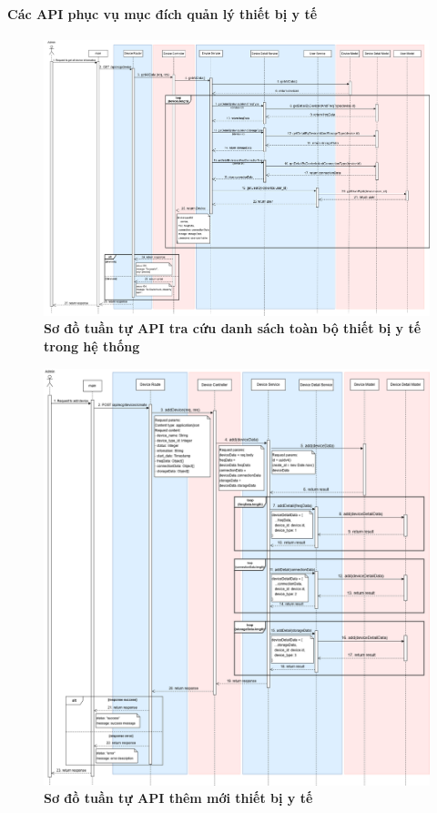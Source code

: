 \paragraph{Các API phục vụ mục đích quản lý thiết bị y tế}
\mbox{}
\begin{figure}[H]
	\centering
	\includegraphics[width=16cm]{Images/api_sequence/device/device-GetAllDevice.drawio.png}
	\caption[Sơ đồ tuần tự API tra cứu danh sách toàn bộ thiết bị y tế trong hệ thống]{\bfseries \fontsize{12pt}{0pt}\selectfont Sơ đồ tuần tự API tra cứu danh sách toàn bộ thiết bị y tế trong hệ thống}
	\label{sequence_diagram_get_all_devices}
\end{figure}

\begin{figure}[H]
	\centering
	\includegraphics[width=16cm]{Images/api_sequence/device/device-Add.drawio.png}
	\caption[Sơ đồ tuần tự API thêm mới thiết bị y tế]{\bfseries \fontsize{12pt}{0pt}\selectfont Sơ đồ tuần tự API thêm mới thiết bị y tế}
	\label{sequence_diagram_add_device}
\end{figure}

